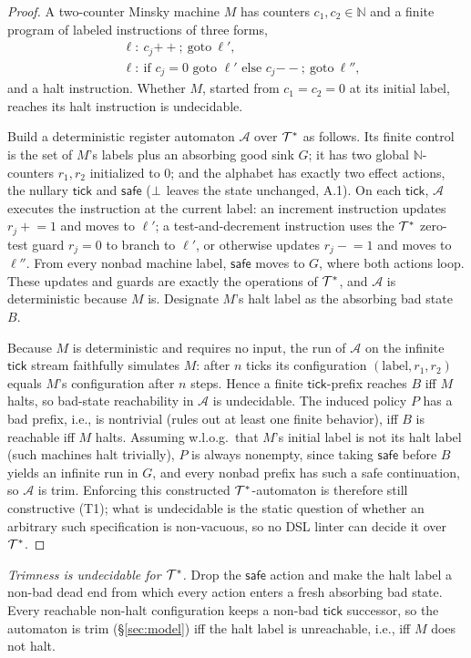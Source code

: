 \begin{proof}
A two-counter Minsky machine $M$ has counters $c_1,c_2\in\mathbb{N}$ and a finite
program of labeled instructions of three forms,
\[
\begin{aligned}
&\ell:\ c_j\mathbin{+{+}};\ \mathrm{goto}\ \ell',\\
&\ell:\ \text{if }c_j=0\text{ goto }\ell'\text{ else }c_j\mathbin{-{-}};\ \mathrm{goto}\ \ell'',
\end{aligned}
\]
and a halt instruction. Whether $M$, started from $c_1=c_2=0$ at its initial
label, reaches its halt instruction is undecidable.

Build a deterministic register automaton $\mathcal A$ over $\mathcal{T}^{\ast}$ as follows.
Its finite control is the set of $M$'s labels plus an absorbing good sink $G$;
it has two global $\mathbb N$-counters $r_1,r_2$ initialized to $0$; and the
alphabet has exactly two effect actions, the nullary $\mathsf{tick}$ and $\mathsf{safe}$ ($\bot$ leaves the state unchanged, A.1). On each
$\mathsf{tick}$, $\mathcal A$ executes the instruction at the current label: an
increment instruction updates $r_j\mathrel{+}=1$ and moves to $\ell'$; a
test-and-decrement instruction uses the $\mathcal{T}^{\ast}$ zero-test guard $r_j=0$ to
branch to $\ell'$, or otherwise updates $r_j\mathrel{-}=1$ and moves to
$\ell''$. From every nonbad machine label, $\mathsf{safe}$ moves to $G$, where
both actions loop. These updates and guards are exactly the operations of
$\mathcal{T}^{\ast}$, and $\mathcal A$ is deterministic because $M$ is. Designate
$M$'s halt label as the absorbing bad state $B$.

Because $M$ is deterministic and requires no input, the run of $\mathcal A$ on the
infinite $\mathsf{tick}$ stream faithfully simulates $M$: after $n$ ticks its
configuration $(\text{label},r_1,r_2)$ equals $M$'s configuration after $n$ steps.
Hence a finite $\mathsf{tick}$-prefix reaches $B$ iff $M$ halts, so bad-state
reachability in $\mathcal A$ is undecidable. The induced policy $P$ has a bad
prefix, i.e., is nontrivial (rules out at least one finite behavior), iff $B$ is
reachable iff $M$ halts. Assuming w.l.o.g.\ that $M$'s initial label is not its halt label (such machines halt trivially), $P$ is always nonempty, since taking
$\mathsf{safe}$ before $B$ yields an infinite run in $G$, and every nonbad
prefix has such a safe continuation, so $\mathcal A$ is trim. Enforcing this constructed
$\mathcal{T}^{\ast}$-automaton is therefore still constructive
(T1); what is undecidable is the static question of whether an arbitrary such specification is
non-vacuous, so no DSL linter can decide it over $\mathcal{T}^{\ast}$.
\end{proof}
\noindent\emph{Trimness is undecidable for $\mathcal{T}^{\ast}$.} Drop the $\mathsf{safe}$ action and make the
halt label a non-bad dead end from which every action enters a fresh absorbing bad state. Every reachable non-halt
configuration keeps a non-bad $\mathsf{tick}$ successor, so the automaton is trim (\S\ref{sec:model})
iff the halt label is unreachable, i.e., iff $M$ does not halt.

